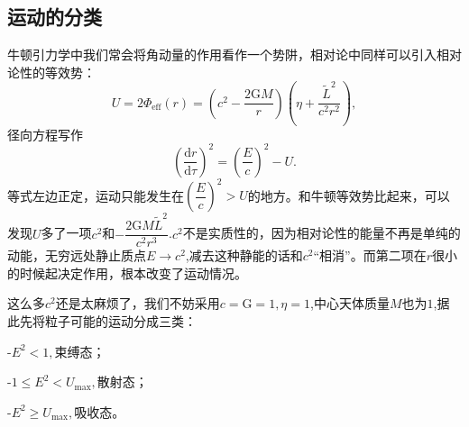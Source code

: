 \documentclass[11pt, a4paper, oneside, onecolumn]{ctexart}
\numberwithin{equation}{subsection}
\begin{document}
\subsection{运动的分类}
牛顿引力学中我们常会将角动量的作用看作一个势阱，相对论中同样可以引入相对论性的等效势：
\begin{equation}
U=2\Phi_{\text{eff}}\left(r\right)=\left(c^{2}-\frac{2\mathrm{G}M}{r}\right)\left(\eta+\frac{\widetilde{L}^{2}}{c^{2}r^{2}}\right),
\end{equation}
径向方程写作
\begin{equation}
\left(\frac{\mathrm{d}r}{\mathrm{d}\tau}\right)^{2}=\left(\frac{E}{c}\right)^{2}-U.
\end{equation}
等式左边正定，运动只能发生在$\left(\dfrac{E}{c}\right)^{2}>U$的地方。和牛顿等效势比起来，可以发现$U$多了一项$c^{2}$和$-\dfrac{2\mathrm{G}M\widetilde{L}^{2}}{c^{2}r^{3}}$.$c^{2}$不是实质性的，因为相对论性的能量不再是单纯的动能，无穷远处静止质点$E\to c^{2}$,减去这种静能的话和$c^{2}$“相消”。而第二项在$r$很小的时候起决定作用，根本改变了运动情况。

这么多$c^{2}$还是太麻烦了，我们不妨采用$c=\mathrm{G}=1,\eta=1$,中心天体质量$M$也为$1$,据此先将粒子可能的运动分成三类：

\quad-\quad $E^{2}<1,$束缚态；

\quad-\quad $1\le E^{2}<U_{\max},$散射态；

\quad-\quad $E^{2}\ge U_{\max},$吸收态。
\end{document}
